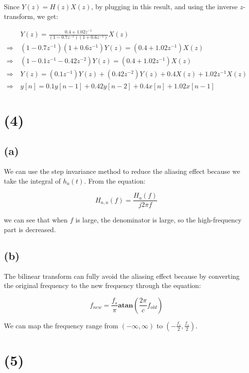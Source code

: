 \documentclass{article}
\begin{document}
Since $Y(z) = H(z)X(z)$, by plugging in this result, and using the inverse $z$-transform, we get:

\begin{align*}
    &Y(z) = \frac{0.4 + 1.02z^{-1}}{(1-0.7z^{-1})(1+0.6z^{-1})}X(z) \\
    \Rightarrow \ &(1-0.7z^{-1})(1+0.6z^{-1})Y(z) = (0.4 + 1.02z^{-1})X(z) \\
    \Rightarrow \ & (1 - 0.1z^{-1} - 0.42z^{-2})Y(z) = (0.4 + 1.02z^{-1})X(z) \\
    \Rightarrow \ & Y(z) = (0.1z^{-1})Y(z) + (0.42z^{-2})Y(z) + 0.4X(z) + 1.02z^{-1}X(z) \\
    \Rightarrow \ &y[n] = 0.1y[n-1] + 0.42y[n-2] + 0.4x[n] + 1.02x[n-1] \qquad 
\end{align*}

\section*{(4)}

\subsection*{(a)}

We can use the step invariance method to reduce the aliasing effect because we take the integral of $h_a(t)$.
From the equation:

\begin{equation*}
    H_{a,u}(f) = \frac{H_a(f)}{j2\pi f}
\end{equation*}

we can see that when $f$ is large, the denominator is large, so the high-frequency part is decreased.

\subsection*{(b)}

The bilinear transform can fully avoid the aliasing effect because 
by converting the original frequency to the new frequency through the equation:

\begin{equation*}
    f_{new} = \frac{f_s}{\pi}\mathbf{atan}(\frac{2\pi}{c}f_{old})
\end{equation*}

We can map the frequency range from $(-\infty, \infty)$ to $(-\frac{f_s}{2}, \frac{f_s}{2})$.

\section*{(5)}
\end{document}
